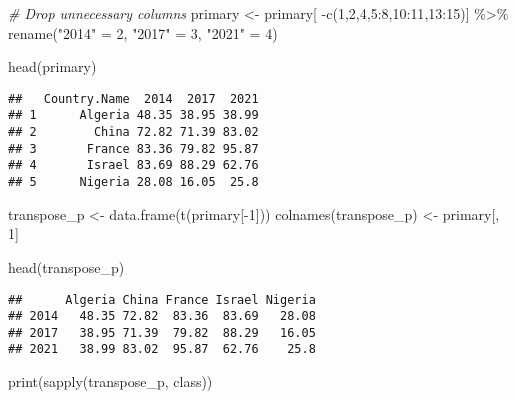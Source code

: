 \documentclass[
]{article}
\newenvironment{Shaded}{\begin{snugshade}}{\end{snugshade}}
\newcommand{\CommentTok}[1]{\textcolor[rgb]{0.56,0.35,0.01}{\textit{#1}}}
\newcommand{\DecValTok}[1]{\textcolor[rgb]{0.00,0.00,0.81}{#1}}
\newcommand{\FunctionTok}[1]{\textcolor[rgb]{0.00,0.00,0.00}{#1}}
\newcommand{\NormalTok}[1]{#1}
\newcommand{\OtherTok}[1]{\textcolor[rgb]{0.56,0.35,0.01}{#1}}
\newcommand{\SpecialCharTok}[1]{\textcolor[rgb]{0.00,0.00,0.00}{#1}}
\newcommand{\StringTok}[1]{\textcolor[rgb]{0.31,0.60,0.02}{#1}}
\begin{document}
\begin{Shaded}
\begin{Highlighting}[]
\CommentTok{\# Drop unnecessary columns}
\NormalTok{primary }\OtherTok{\textless{}{-}}\NormalTok{ primary[ }\SpecialCharTok{{-}}\FunctionTok{c}\NormalTok{(}\DecValTok{1}\NormalTok{,}\DecValTok{2}\NormalTok{,}\DecValTok{4}\NormalTok{,}\DecValTok{5}\SpecialCharTok{:}\DecValTok{8}\NormalTok{,}\DecValTok{10}\SpecialCharTok{:}\DecValTok{11}\NormalTok{,}\DecValTok{13}\SpecialCharTok{:}\DecValTok{15}\NormalTok{)] }\SpecialCharTok{\%\textgreater{}\%}
  \FunctionTok{rename}\NormalTok{(}\StringTok{"2014"} \OtherTok{=} \DecValTok{2}\NormalTok{, }\StringTok{"2017"} \OtherTok{=} \DecValTok{3}\NormalTok{, }\StringTok{"2021"} \OtherTok{=} \DecValTok{4}\NormalTok{)}

\FunctionTok{head}\NormalTok{(primary)}
\end{Highlighting}
\end{Shaded}

\begin{verbatim}
##   Country.Name  2014  2017  2021
## 1      Algeria 48.35 38.95 38.99
## 2        China 72.82 71.39 83.02
## 3       France 83.36 79.82 95.87
## 4       Israel 83.69 88.29 62.76
## 5      Nigeria 28.08 16.05  25.8
\end{verbatim}

\begin{Shaded}
\begin{Highlighting}[]
\NormalTok{transpose\_p }\OtherTok{\textless{}{-}} \FunctionTok{data.frame}\NormalTok{(}\FunctionTok{t}\NormalTok{(primary[}\SpecialCharTok{{-}}\DecValTok{1}\NormalTok{]))}
\FunctionTok{colnames}\NormalTok{(transpose\_p) }\OtherTok{\textless{}{-}}\NormalTok{ primary[, }\DecValTok{1}\NormalTok{]}

\FunctionTok{head}\NormalTok{(transpose\_p)}
\end{Highlighting}
\end{Shaded}

\begin{verbatim}
##      Algeria China France Israel Nigeria
## 2014   48.35 72.82  83.36  83.69   28.08
## 2017   38.95 71.39  79.82  88.29   16.05
## 2021   38.99 83.02  95.87  62.76    25.8
\end{verbatim}

\begin{Shaded}
\begin{Highlighting}[]
\FunctionTok{print}\NormalTok{(}\FunctionTok{sapply}\NormalTok{(transpose\_p, class))}
\end{Highlighting}
\end{Shaded}
\end{document}
